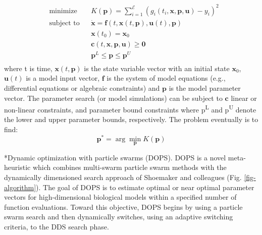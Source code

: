 \documentclass[12pt]{article}
\makeatletter
\renewcommand\subsection{\@startsection
	{subsection}{2}{0mm}
	{-0.05in}
	{-0.5\baselineskip}
	{\normalfont\normalsize\bfseries}}
\makeatother
\begin{document}
\begin{equation}\label{eq:static_opt}
\begin{aligned}
& \text{minimize}
& & K(\mathbf{p})=\sum_{i=1}^\mathcal{E} \left(g_i(t_i,\mathbf{x,p,u})-y_i\right)^2 \\
& \text{subject to}
&&\dot{\mathbf{x}}=\mathbf{f}(t,\mathbf{x}(t,\mathbf{p}),\mathbf{u}(t),\mathbf{p})\\
&&&\mathbf{x}(t_0) = \mathbf{x}_0\\
&&&\mathbf{c}(t,\mathbf{x,p,u}) \geqslant \mathbf{0} \\
&&& \mathbf{p}^L \leqslant \mathbf{p} \leqslant \mathbf{p}^U\\
\end{aligned}
\end{equation}
where t is time, $\mathbf{x}\left(t,\mathbf{p}\right)$ is the state variable vector with an initial state $\mathbf{x}_{0}$, $\mathbf{u}(t)$ is a model input vector,
$\mathbf{f}$ is the system of model equations (e.g., differential equations or algebraic constraints) and $\mathbf{p}$ is the model parameter vector.
The parameter search (or model simulations) can be subject to $\mathbf{c}$ linear or non-linear constraints, and parameter bound constraints where
p\textsuperscript{L} and p\textsuperscript{U} denote the lower and upper parameter bounds, respectively.
The problem eventually is to find:
\begin{equation}\label{eq:static_opt_2}
\mathbf{p^{*}}= \arg\min_{\mathbf{p}} K\left(\mathbf{\mathbf{p}}\right)
\end{equation}

\subsection*{Dynamic optimization with particle swarms (DOPS).}
DOPS is a novel meta-heuristic which combines multi-swarm particle swarm methods with the dynamically dimensioned search approach of Shoemaker and colleagues (Fig. \ref{fig-algorithm}).
The goal of DOPS is to estimate optimal or near optimal parameter vectors for high-dimensional biological models within a specified number of function evaluations.
Toward this objective, DOPS begins by using a particle swarm search and then dynamically switches, using an adaptive switching criteria, to the DDS search phase.
\end{document}
